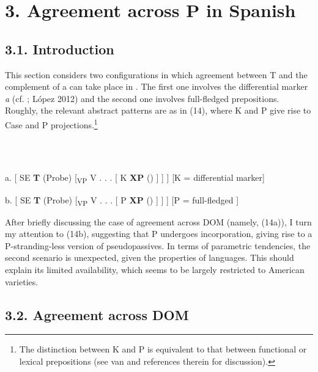 \documentclass[output=paper]{langsci/langscibook}
\begin{document}
\section{ 3. Agreement across P in Spanish} 

\subsection{ 3.1. Introduction}

This section considers two configurations in which agreement between T and the complement of a  can take place in . The first one involves the differential marker \textit{a} (cf. \citealt{Torrego1998}; López 2012) and the second one involves full-fledged prepositions. Roughly, the relevant abstract patterns are as in (14), where K and P give rise to Case and P projections.\footnote{The distinction between K and P is equivalent to that between functional or lexical prepositions (see van \citealt{Riemsdijk1990} and references therein for discussion).}

\ea%
    \label{ex:key:14}
    \gll\\
        \\
    \glt
    \z

          a.   [ SE \textbf{T} (Probe)  [\textsubscript{VP} V . . . [ K \textbf{XP} () ] ] ]  [K = differential marker]

 

  b.   [ SE \textbf{T} (Probe)  [\textsubscript{VP} V . . . [ P \textbf{XP} () ] ] ]  [P = full-fledged ]

 

After briefly discussing the case of agreement across DOM (namely, (14a)), I turn my attention to (14b), suggesting that P undergoes incorporation, giving rise to a P-stranding-less version of pseudopassives. In terms of parametric tendencies, the second scenario is unexpected, given the properties of  languages. This should explain its limited availability, which seems to be largely restricted to American varieties.

\subsection{ 3.2. Agreement across DOM}
\end{document}
